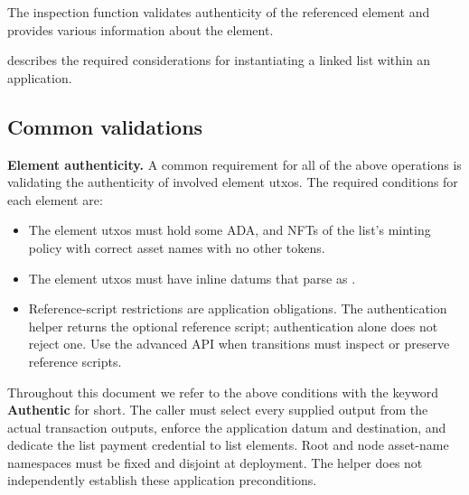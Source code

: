 \documentclass[../midgard.tex]{subfiles}
\begin{document}
The inspection function validates authenticity of the referenced element and provides various information about the element.

 describes the required considerations for instantiating a linked list within an application.

\subsection{Common validations}
\label{h:list-common-validations}

\textbf{Element authenticity.} A common requirement for all of the above operations is validating the authenticity of involved element utxos.
The required conditions for each element are:
\begin{itemize}
    \item The element utxos must hold some ADA, and NFTs of the list's minting policy with correct asset names with no other tokens.
    \item The element utxos must have inline datums that parse as .
    \item Reference-script restrictions are application obligations. The authentication helper returns the optional reference script; authentication alone does not reject one. Use the advanced API when transitions must inspect or preserve reference scripts.
\end{itemize}

Throughout this document we refer to the above conditions with the keyword \textbf{Authentic} for short.
The caller must select every supplied output from the actual transaction outputs, enforce the application datum and destination, and dedicate the list payment credential to list elements. Root and node asset-name namespaces must be fixed and disjoint at deployment. The helper does not independently establish these application preconditions.
\end{document}

